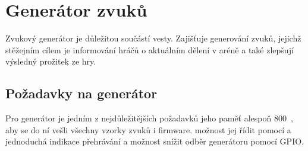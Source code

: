 \chapter{Generátor zvuků}
Zvukový generátor je důležitou součástí  vesty. Zajišťuje generování zvuků, jejichž stěžejním cílem je informování hráčů o aktuálním dělení v aréně a také zlepšují výsledný prožitek ze hry.

\section{Požadavky na generátor}
Pro generátor je jedním z nejdůležitějších požadavků jeho paměť alespoň 800~, aby se do ní vešli všechny vzorky zvuků i firmware.  možnost jej řídit pomocí  a jednoduchá indikace přehrávání a možnost snížit odběr generátoru pomocí GPIO.



